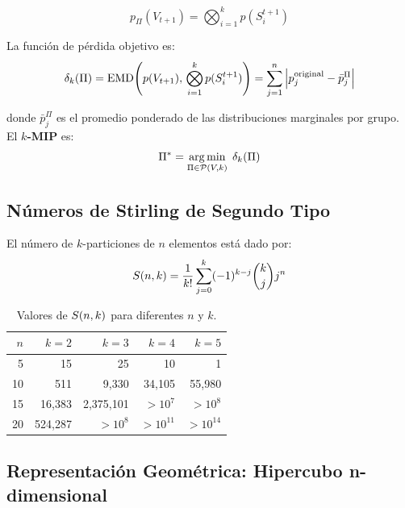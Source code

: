 \begin{equation}
    p_\Pi(V_{t+1}) = \bigotimes_{i=1}^{k} p(S_i^{t+1})
\end{equation}

La función de pérdida objetivo es:
\begin{equation}
    \delta_k(\Pi) = \operatorname{EMD}\!\left(p(V_{t+1}),\, \bigotimes_{i=1}^{k} p(S_i^{t+1})\right)
    = \sum_{j=1}^{n} \left| p_j^{\text{original}} - \bar{p}_j^{\Pi} \right|
    \label{eq:loss}
\end{equation}

donde $\bar{p}_j^{\Pi}$ es el promedio ponderado de las distribuciones marginales por grupo. El \textbf{$k$-MIP} es:
\begin{equation}
    \Pi^* = \operatorname*{arg\,min}_{\Pi \in \mathcal{P}(V,k)}\; \delta_k(\Pi)
    \label{eq:kmip}
\end{equation}

\subsection{Números de Stirling de Segundo Tipo}

El número de $k$-particiones de $n$ elementos está dado por:
\begin{equation}
    S(n,k) = \frac{1}{k!} \sum_{j=0}^{k} (-1)^{k-j} \binom{k}{j} j^n
    \label{eq:stirling}
\end{equation}

\begin{table}[H]
    \centering
    \caption{Valores de $S(n,k)$ para diferentes $n$ y $k$.}
    \label{tab:stirling}
    \begin{tabular}{rrrrr}
        \toprule
        $n$ & $k=2$ & $k=3$ & $k=4$ & $k=5$ \\
        \midrule
        5  & 15        & 25          & 10           & 1 \\
        10 & 511       & 9{,}330     & 34{,}105     & 55{,}980 \\
        15 & 16{,}383  & 2{,}375{,}101 & $>10^7$  & $>10^8$ \\
        20 & 524{,}287 & $>10^8$     & $>10^{11}$  & $>10^{14}$ \\
        \bottomrule
    \end{tabular}
\end{table}

\subsection{Representación Geométrica: Hipercubo n-dimensional}

